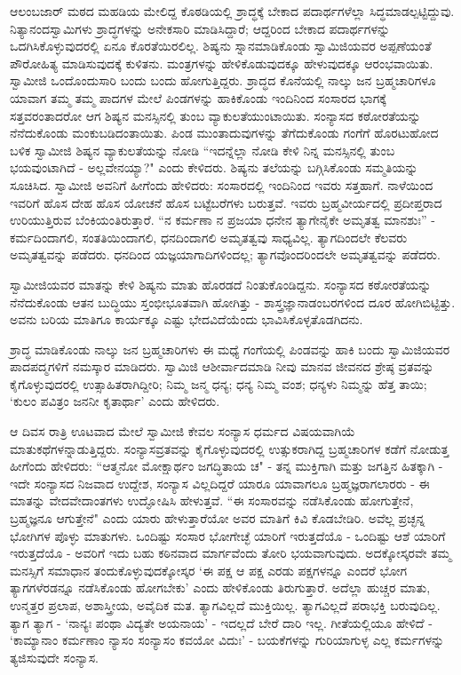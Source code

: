 ಆಲಂಬಜಾರ್ ಮಠದ ಮಹಡಿಯ ಮೇಲಿದ್ದ ಕೊಠಡಿಯಲ್ಲಿ ಶ್ರಾದ್ಧಕ್ಕೆ ಬೇಕಾದ ಪದಾರ್ಥಗಳೆಲ್ಲಾ ಸಿದ್ಧಮಾಡಲ್ಪಟ್ಟಿದ್ದುವು. ನಿತ್ಯಾನಂದಸ್ವಾಮಿಗಳು ಶ್ರಾದ್ಧಗಳನ್ನು ಅನೇಕಸಾರಿ ಮಾಡಿಸಿದ್ದಾರೆ; ಆದ್ದರಿಂದ ಬೇಕಾದ ಪದಾರ್ಥಗಳನ್ನು ಒದಗಿಸಿಕೊಳ್ಳುವುದರಲ್ಲಿ ಏನೂ ಕೊರತೆಯಿರಲಿಲ್ಲ. ಶಿಷ್ಯನು ಸ್ನಾನಮಾಡಿಕೊಂಡು ಸ್ವಾಮಿಜಿಯವರ ಅಪ್ಪಣೆಯಂತೆ ಪೌರೋಹಿತ್ಯ ಮಾಡಿಸುವುದಕ್ಕೆ ಕುಳಿತನು. ಮಂತ್ರಗಳನ್ನು ಹೇಳಿಕೊಡುವುದಕ್ಕೂ ಹೇಳುವುದಕ್ಕೂ ಆರಂಭವಾಯಿತು. ಸ್ವಾಮೀಜಿ ಒಂದೊಂದುಸಾರಿ ಬಂದು ಬಂದು ಹೋಗುತ್ತಿದ್ದರು. ಶ್ರಾದ್ಧದ ಕೊನೆಯಲ್ಲಿ ನಾಲ್ಕು ಜನ ಬ್ರಹ್ಮಚಾರಿಗಳೂ ಯಾವಾಗ ತಮ್ಮ ತಮ್ಮ ಪಾದಗಳ ಮೇಲೆ ಪಿಂಡಗಳನ್ನು ಹಾಕಿಕೊಂಡು ಇಂದಿನಿಂದ ಸಂಸಾರದ ಭಾಗಕ್ಕೆ ಸತ್ತವರಂತಾದರೋ ಆಗ ಶಿಷ್ಯನ ಮನಸ್ಸಿನಲ್ಲಿ ತುಂಬ ವ್ಯಾಕುಲತೆಯುಂಟಾಯಿತು. ಸಂನ್ಯಾಸದ ಕಠೋರತೆಯನ್ನು ನೆನೆದುಕೊಂಡು ಮಂಕುಬಡಿದಂತಾಯಿತು. ಪಿಂಡ ಮುಂತಾದುವುಗಳನ್ನು ತೆಗೆದುಕೊಂಡು ಗಂಗೆಗೆ ಹೊರಟುಹೋದ ಬಳಿಕ ಸ್ವಾಮೀಜಿ ಶಿಷ್ಯನ ವ್ಯಾಕುಲತೆಯನ್ನು ನೋಡಿ “ಇದನ್ನೆಲ್ಲಾ ನೋಡಿ ಕೇಳಿ ನಿನ್ನ ಮನಸ್ಸಿನಲ್ಲಿ ತುಂಬ ಭಯವುಂಟಾಗಿದೆ - ಅಲ್ಲವೇನಯ್ಯಾ?" ಎಂದು ಕೇಳಿದರು. ಶಿಷ್ಯನು ತಲೆಯನ್ನು ಬಗ್ಗಿಸಿಕೊಂಡು ಸಮ್ಮತಿಯನ್ನು ಸೂಚಿಸಿದ. ಸ್ವಾಮೀಜಿ ಅವನಿಗೆ ಹೀಗೆಂದು ಹೇಳಿದರು: ಸಂಸಾರದಲ್ಲಿ ಇಂದಿನಿಂದ ಇವರು ಸತ್ತಹಾಗೆ. ನಾಳೆಯಿಂದ ಇವರಿಗೆ ಹೊಸ ದೇಹ ಹೊಸ ಯೋಚನೆ ಹೊಸ ಬಟ್ಟೆಬರೆಗಳು ಬರುತ್ತವೆ. ಇವರು ಬ್ರಹ್ಮವೀರ್ಯದಲ್ಲಿ ಪ್ರದೀಪ್ತರಾದ ಉರಿಯುತ್ತಿರುವ ಬೆಂಕಿಯಂತಿರುತ್ತಾರೆ. “ನ ಕರ್ಮಣಾ ನ ಪ್ರಜಯಾ ಧನೇನ ತ್ಯಾಗೇನೈಕೇ ಅಮೃತತ್ವ ಮಾನಶುಃ” - ಕರ್ಮದಿಂದಾಗಲಿ, ಸಂತತಿಯಿಂದಾಗಲಿ, ಧನದಿಂದಾಗಲಿ ಅಮೃತತ್ವವು ಸಾಧ್ಯವಿಲ್ಲ. ತ್ಯಾಗದಿಂದಲೇ ಕೆಲವರು ಅಮೃತತ್ವವನ್ನು ಪಡೆದರು. ಧನದಿಂದ ಯಜ್ಞಯಾಗಾದಿಗಳಿಂದಲ್ಲ; ತ್ಯಾಗವೊಂದರಿಂದಲೇ ಅಮೃತತ್ವವನ್ನು ಪಡೆದರು.

ಸ್ವಾಮೀಜಿಯವರ ಮಾತನ್ನು ಕೇಳಿ ಶಿಷ್ಯನು ಮಾತು ಹೊರಡದೆ ನಿಂತುಕೊಂಡಿದ್ದನು. ಸಂನ್ಯಾಸದ ಕಠೋರತೆಯನ್ನು ನೆನೆದುಕೊಂಡು ಆತನ ಬುದ್ಧಿಯು ಸ್ತಂಭೀಭೂತವಾಗಿ ಹೋಗಿತ್ತು - ಶಾಸ್ತ್ರಜ್ಞಾನಾಡಂಬರಗಳಿಂದ ದೂರ ಹೋಗಿಬಿಟ್ಟಿತ್ತು. ಅವನು ಬರಿಯ ಮಾತಿಗೂ ಕಾರ್ಯಕ್ಕೂ ಎಷ್ಟು ಭೇದವಿದೆಯೆಂದು ಭಾವಿಸಿಕೊಳ್ಳತೊಡಗಿದನು.

ಶ್ರಾದ್ಧ ಮಾಡಿಕೊಂಡು ನಾಲ್ಕು ಜನ ಬ್ರಹ್ಮಚಾರಿಗಳು ಈ ಮಧ್ಯೆ ಗಂಗೆಯಲ್ಲಿ ಪಿಂಡವನ್ನು ಹಾಕಿ ಬಂದು ಸ್ವಾಮಿಜಿಯವರ ಪಾದಪದ್ಮಗಳಿಗೆ ನಮಸ್ಕಾರ ಮಾಡಿದರು. ಸ್ವಾಮಿಜಿ ಆಶೀರ್ವಾದಮಾಡಿ ನೀವು ಮಾನವ ಜೀವನದ ಶ್ರೇಷ್ಠ ವ್ರತವನ್ನು ಕೈಗೊಳ್ಳುವುದರಲ್ಲಿ ಉತ್ಸಾಹಿತರಾಗಿದ್ದೀರಿ; ನಿಮ್ಮ ಜನ್ಮ ಧನ್ಯ; ಧನ್ಯ ನಿಮ್ಮ ವಂಶ; ಧನ್ಯಳು ನಿಮ್ಮನ್ನು ಹೆತ್ತ ತಾಯಿ; ‘ಕುಲಂ ಪವಿತ್ರಂ ಜನನೀ ಕೃತಾರ್ಥಾ’ ಎಂದು ಹೇಳಿದರು.

ಆ ದಿವಸ ರಾತ್ರಿ ಊಟವಾದ ಮೇಲೆ ಸ್ವಾಮೀಜಿ ಕೇವಲ ಸಂನ್ಯಾಸ ಧರ್ಮದ ವಿಷಯವಾಗಿಯೆ ಮಾತುಕಥೆಗಳನ್ನಾಡುತ್ತಿದ್ದರು. ಸಂನ್ಯಾಸವ್ರತವನ್ನು ಕೈಗೊಳ್ಳುವುದರಲ್ಲಿ ಉತ್ಸುಕರಾಗಿದ್ದ ಬ್ರಹ್ಮಚಾರಿಗಳ ಕಡೆಗೆ ನೋಡುತ್ತ ಹೀಗೆಂದು ಹೇಳಿದರು: “ಆತ್ಮನೋ ಮೋಕ್ಷಾರ್ಥಂ ಜಗದ್ಧಿತಾಯ ಚ" - ತನ್ನ ಮುಕ್ತಿಗಾಗಿ ಮತ್ತು ಜಗತ್ತಿನ ಹಿತಕ್ಕಾಗಿ - ಇದೇ ಸಂನ್ಯಾಸದ ನಿಜವಾದ ಉದ್ದೇಶ, ಸಂನ್ಯಾಸ ವಿಲ್ಲದಿದ್ದರೆ ಯಾರೂ ಯಾವಾಗಲೂ ಬ್ರಹ್ಮಜ್ಞರಾಗಲಾರರು - ಈ ಮಾತನ್ನು ವೇದವೇದಾಂತಗಳು ಉದ್ಘೋಷಿಸಿ ಹೇಳುತ್ತವೆ. “ಈ ಸಂಸಾರವನ್ನು ನಡೆಸಿಕೊಂಡು ಹೋಗುತ್ತೇನೆ, ಬ್ರಹ್ಮಜ್ಞನೂ ಆಗುತ್ತೇನೆ" ಎಂದು ಯಾರು ಹೇಳುತ್ತಾರೆಯೋ ಅವರ ಮಾತಿಗೆ ಕಿವಿ ಕೊಡಬೇಡಿರಿ. ಅವೆಲ್ಲ ಪ್ರಚ್ಛನ್ನ ಭೋಗಿಗಳ ಪೊಳ್ಳು ಮಾತುಗಳು. ಒಂದಿಷ್ಟು ಸಂಸಾರ ಭೋಗೇಚ್ಛೆ ಯಾರಿಗೆ ಇರುತ್ತದೆಯೊ - ಒಂದಿಷ್ಟು ಆಶೆ ಯಾರಿಗೆ ಇರುತ್ತದೆಯೊ - ಅವರಿಗೆ ಇದು ಬಹು ಕಠಿನವಾದ ಮಾರ್ಗವೆಂದು ತೋರಿ ಭಯವಾಗುವುದು. ಅದಕ್ಕೋಸ್ಕರವೇ ತಮ್ಮ ಮನಸ್ಸಿಗೆ ಸಮಾಧಾನ ತಂದುಕೊಳ್ಳುವುದಕ್ಕೋಸ್ಕರ ‘ಈ ಪಕ್ಷ ಆ ಪಕ್ಷ ಎರಡು ಪಕ್ಷಗಳನ್ನೂ ಎಂದರೆ ಭೋಗ ತ್ಯಾಗಗಳೆರಡನ್ನೂ ನಡೆಸಿಕೊಂಡು ಹೋಗಬೇಕು’ ಎಂದು ಹೇಳಿಕೊಂಡು ತಿರುಗುತ್ತಾರೆ. ಅದೆಲ್ಲಾ ಹುಚ್ಚರ ಮಾತು, ಉನ್ಮತ್ತರ ಪ್ರಲಾಪ, ಅಶಾಸ್ತ್ರೀಯ, ಅವೈದಿಕ ಮತ. ತ್ಯಾಗವಿಲ್ಲದೆ ಮುಕ್ತಿಯಿಲ್ಲ. ತ್ಯಾಗವಿಲ್ಲದೆ ಪರಾಭಕ್ತಿ ಬರುವುದಿಲ್ಲ. ತ್ಯಾಗ ತ್ಯಾಗ - ‘ನಾನ್ಯಃ ಪಂಥಾ ವಿದ್ಯತೇ ಅಯನಾಯ’ - ಇದಲ್ಲದೆ ಬೇರೆ ದಾರಿ ಇಲ್ಲ. ಗೀತೆಯಲ್ಲಿಯೂ ಹೇಳಿದೆ - ‘ಕಾಮ್ಯಾನಾಂ ಕರ್ಮಣಾಂ ನ್ಯಾಸಂ ಸಂನ್ಯಾಸಂ ಕವಯೋ ವಿದುಃ’ - ಬಯಕೆಗಳನ್ನು ಗುರಿಯಾಗುಳ್ಳ ಎಲ್ಲ ಕರ್ಮಗಳನ್ನು ತ್ಯಜಿಸುವುದೇ ಸಂನ್ಯಾಸ.

